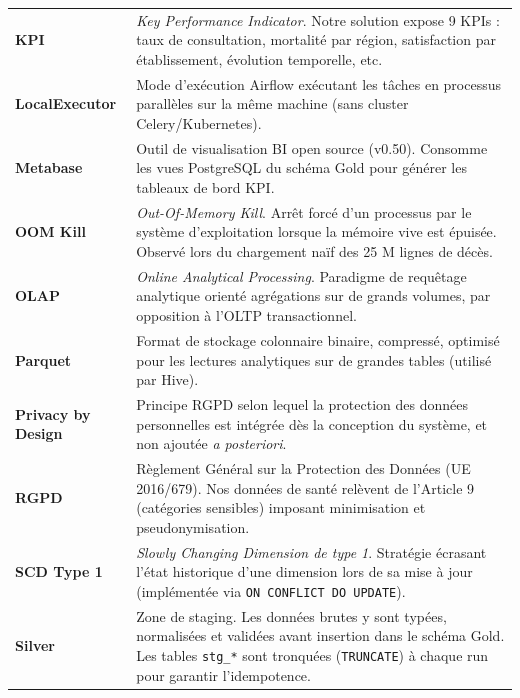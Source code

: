 \documentclass[12pt,a4paper]{report}
\begin{document}
\begin{longtable}{@{} p{3.8cm} p{10.8cm} @{}}
\textbf{KPI} &
    \textit{Key Performance Indicator}. Notre solution expose 9 KPIs :
    taux de consultation, mortalité par région, satisfaction par établissement,
    évolution temporelle, etc. \\[4pt]

\textbf{LocalExecutor} &
    Mode d'exécution Airflow exécutant les tâches en processus parallèles
    sur la même machine (sans cluster Celery/Kubernetes). \\[4pt]

\textbf{Metabase} &
    Outil de visualisation BI open source (v0.50). Consomme les vues
    PostgreSQL du schéma Gold pour générer les tableaux de bord KPI. \\[4pt]

\textbf{OOM Kill} &
    \textit{Out-Of-Memory Kill}. Arrêt forcé d'un processus par le système
    d'exploitation lorsque la mémoire vive est épuisée. Observé lors du
    chargement naïf des 25 M lignes de décès. \\[4pt]

\textbf{OLAP} &
    \textit{Online Analytical Processing}. Paradigme de requêtage analytique
    orienté agrégations sur de grands volumes, par opposition à l'OLTP
    transactionnel. \\[4pt]

\textbf{Parquet} &
    Format de stockage colonnaire binaire, compressé, optimisé pour les
    lectures analytiques sur de grandes tables (utilisé par Hive). \\[4pt]

\textbf{Privacy by Design} &
    Principe RGPD selon lequel la protection des données personnelles est
    intégrée dès la conception du système, et non ajoutée \textit{a posteriori}. \\[4pt]

\textbf{RGPD} &
    Règlement Général sur la Protection des Données (UE 2016/679).
    Nos données de santé relèvent de l'Article 9 (catégories sensibles)
    imposant minimisation et pseudonymisation. \\[4pt]

\textbf{SCD Type 1} &
    \textit{Slowly Changing Dimension de type 1}. Stratégie écrasant l'état
    historique d'une dimension lors de sa mise à jour (implémentée via
    \texttt{ON CONFLICT DO UPDATE}). \\[4pt]

\textbf{Silver} &
    Zone de staging. Les données brutes y sont typées, normalisées et
    validées avant insertion dans le schéma Gold. Les tables \texttt{stg\_*}
    sont tronquées (\texttt{TRUNCATE}) à chaque run pour garantir l'idempotence. \\[4pt]


\end{longtable}
\end{document}
